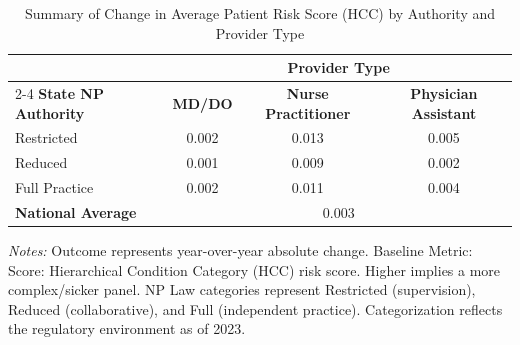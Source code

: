 \begin{table}[htbp]
    \centering
    \caption{Summary of Change in Average Patient Risk Score (HCC) by Authority and Provider Type}
    \label{tab:d_bene_avg_risk_scre}
    \vspace{0.2cm}
    \begin{tabular}{lccc}
        \toprule
        & \multicolumn{3}{c}{\textbf{Provider Type}} \\
        \cmidrule(lr){2-4}
        \textbf{State NP Authority} & \textbf{MD/DO} & \textbf{Nurse Practitioner} & \textbf{Physician Assistant} \\
        \midrule
        Restricted & 0.002 & 0.013 & 0.005 \\
        Reduced & 0.001 & 0.009 & 0.002 \\
        Full Practice & 0.002 & 0.011 & 0.004 \\
        \midrule
        \textbf{National Average} & \multicolumn{3}{c}{0.003} \\
        \bottomrule
    \end{tabular}
    \vspace{0.1cm}
    \begin{minipage}{0.85\textwidth}
        \footnotesize \textit{Notes:} Outcome represents year-over-year absolute change. Baseline Metric: Score: Hierarchical Condition Category (HCC) risk score. Higher implies a more complex/sicker panel. NP Law categories represent Restricted (supervision), Reduced (collaborative), and Full (independent practice). Categorization reflects the regulatory environment as of 2023.
    \end{minipage}
\end{table}